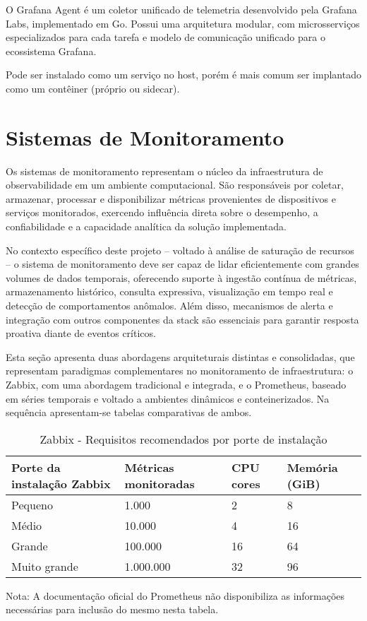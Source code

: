 O Grafana Agent \citep{grafanaagent2025} é um coletor unificado de telemetria desenvolvido pela Grafana Labs, implementado em Go. Possui uma arquitetura modular, com microsserviços especializados para cada tarefa e modelo de comunicação  unificado para o ecossistema Grafana.

Pode ser instalado como um serviço no host, porém é mais comum ser implantado como um contêiner (próprio ou sidecar).


\section{Sistemas de Monitoramento}
\label{section:SistemasMonitoramento}

Os sistemas de monitoramento representam o núcleo da infraestrutura de observabilidade em um ambiente computacional. São responsáveis por coletar, armazenar, processar e disponibilizar métricas provenientes de dispositivos e serviços monitorados, exercendo influência direta sobre o desempenho, a confiabilidade e a capacidade analítica da solução implementada.

No contexto específico deste projeto -- voltado à análise de saturação de recursos -- o sistema de monitoramento deve ser capaz de lidar eficientemente com grandes volumes de dados temporais, oferecendo suporte à ingestão contínua de métricas, armazenamento histórico, consulta expressiva, visualização em tempo real e detecção de comportamentos anômalos. Além disso, mecanismos de alerta e integração com outros componentes da stack são essenciais para garantir resposta proativa diante de eventos críticos.

Esta seção apresenta duas abordagens arquiteturais distintas e consolidadas, que representam paradigmas complementares no monitoramento de infraestrutura: o Zabbix, com uma abordagem tradicional e integrada, e o Prometheus, baseado em séries temporais e voltado a ambientes dinâmicos e conteinerizados. Na sequência apresentam-se tabelas comparativas de ambos.

\begin{table}[H]
\centering
\caption{Zabbix - Requisitos recomendados por porte de instalação}
\label{tab:requisitos-zabbix}
\begin{tabular}{@{}p{4cm} p{3cm} p{2.5cm} p{2.5cm}@{}}
\toprule
\textbf{Porte da instalação Zabbix} & \textbf{Métricas monitoradas} & \textbf{CPU cores} & \textbf{Memória (GiB)} \\
\midrule
Pequeno     & 1.000       & 2   & 8   \\
Médio       & 10.000      & 4   & 16  \\
Grande       & 100.000     & 16  & 64  \\
Muito grande & 1.000.000 & 32  & 96  \\
\bottomrule
\end{tabular}
\begin{flushleft}
\footnotesize

Nota: A documentação oficial do Prometheus não disponibiliza as informações necessárias para inclusão do mesmo nesta tabela. 

\end{flushleft}
\end{table}


